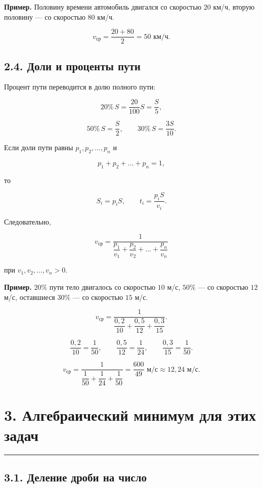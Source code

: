 \documentclass[a4paper,12pt]{article}
\newcommand{\sectionline}{%
  \vspace{0.15em}%
  \noindent\textcolor{accent}{\rule{\linewidth}{0.6pt}}%
  \vspace{0.3em}%
}
\begin{document}
\textbf{Пример.}
Половину времени автомобиль двигался со скоростью $20$ км/ч, вторую половину --- со скоростью $80$ км/ч.

\[
v_{\text{ср}}=
\frac{20+80}{2}
=50\text{ км/ч}.
\]

\subsection*{2.4. Доли и проценты пути}

Процент пути переводится в долю полного пути:

\[
20\%\,S=\frac{20}{100}S=\frac{S}{5},
\]

\[
50\%\,S=\frac{S}{2},
\qquad
30\%\,S=\frac{3S}{10}.
\]

Если доли пути равны $p_1,p_2,\dots,p_n$ и

\[
p_1+p_2+\dots+p_n=1,
\]

то

\[
S_i=p_iS,
\qquad
t_i=\frac{p_iS}{v_i}.
\]

Следовательно,

\[
\boxed{
v_{\text{ср}}=
\frac{1}{\dfrac{p_1}{v_1}+\dfrac{p_2}{v_2}+\dots+\dfrac{p_n}{v_n}}
}
\]

при $v_1,v_2,\dots,v_n>0$.

\textbf{Пример.}
$20\%$ пути тело двигалось со скоростью $10$ м/с, $50\%$ --- со скоростью $12$ м/с, оставшиеся $30\%$ --- со скоростью $15$ м/с.

\[
v_{\text{ср}}=
\frac{1}{\dfrac{0{,}2}{10}+\dfrac{0{,}5}{12}+\dfrac{0{,}3}{15}}.
\]

\[
\frac{0{,}2}{10}=\frac{1}{50},
\qquad
\frac{0{,}5}{12}=\frac{1}{24},
\qquad
\frac{0{,}3}{15}=\frac{1}{50}.
\]

\[
v_{\text{ср}}=
\frac{1}{\dfrac{1}{50}+\dfrac{1}{24}+\dfrac{1}{50}}
=\frac{600}{49}\text{ м/с}
\approx12{,}24\text{ м/с}.
\]


\section*{3. Алгебраический минимум для этих задач}
\sectionline

\subsection*{3.1. Деление дроби на число}
\end{document}

